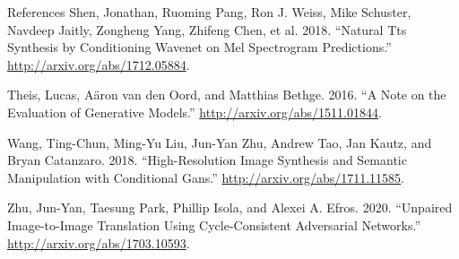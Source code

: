 \begin{frame}[allowframebreaks]{References}
\leavevmode\hypertarget{ref-shen2018natural}{}%
Shen, Jonathan, Ruoming Pang, Ron J. Weiss, Mike Schuster, Navdeep
Jaitly, Zongheng Yang, Zhifeng Chen, et al. 2018. ``Natural Tts
Synthesis by Conditioning Wavenet on Mel Spectrogram Predictions.''
\url{http://arxiv.org/abs/1712.05884}.

\leavevmode\hypertarget{ref-theis2016note}{}%
Theis, Lucas, Aäron van den Oord, and Matthias Bethge. 2016. ``A Note on
the Evaluation of Generative Models.''
\url{http://arxiv.org/abs/1511.01844}.

\leavevmode\hypertarget{ref-wang2018highresolution}{}%
Wang, Ting-Chun, Ming-Yu Liu, Jun-Yan Zhu, Andrew Tao, Jan Kautz, and
Bryan Catanzaro. 2018. ``High-Resolution Image Synthesis and Semantic
Manipulation with Conditional Gans.''
\url{http://arxiv.org/abs/1711.11585}.

\leavevmode\hypertarget{ref-zhu2020unpaired}{}%
Zhu, Jun-Yan, Taesung Park, Phillip Isola, and Alexei A. Efros. 2020.
``Unpaired Image-to-Image Translation Using Cycle-Consistent Adversarial
Networks.'' \url{http://arxiv.org/abs/1703.10593}.

\end{frame}
